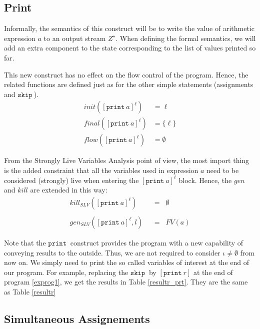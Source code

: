 \documentclass[a4wide,12pt]{article}
\def\eq{\;\; = \;\;}
\def\skip {\texttt{skip}\ }
\def\print{\texttt{print}\ }
\def\program#1{\fbox{\begin{minipage}{0.5\textwidth}\protect{$\begin{array}{ll} #1 \end{array}$}\end{minipage}}}
\def\restabR#1#2[#3]{\begin{table}\label{#3}\begin{center}\caption{#1}\begin{sideways}\end{sideways}\end{center}\end{table}}
\begin{document}
\subsection{Print}
 
Informally, the semantics of this construct will be to write the value of arithmetic expression $a$ to an output
stream $Z^\star$. When defining the formal semantics, we will add an extra component to the state corresponding to the
list of values printed so far.
 
This new construct has no effect on the flow control of the program. Hence, the related functions are
defined just as for the other simple statements (assignments and $\skip$).
\begin{align*}
init([\print a]^\ell) & = \ell \\
final([\print a]^\ell) & = \{\ell\} \\
flow([\print a]^\ell) & = \emptyset
\end{align*}
 
From the Strongly Live Variables Analysis point of view, the most import thing is
the added constraint that all the variables used in expression $a$ need to be
considered (strongly) live when entering the $[\print a]^\ell$ block. Hence, the $gen$ and $kill$ are extended in this way:
\begin{align*}
kill_{SLV}([\print a]^\ell) & \eq \emptyset \\
\\
gen_{SLV}([\print a]^\ell,l) & \eq FV(a)
\end{align*}
 
Note that the $\print$ construct provides the program with a new capability of conveying
results to the outside. Thus, we are not required to consider $\iota \neq \emptyset$ from now on.
We simply need to print the so called variables of interest at the end of our program.
For example, replacing the $\skip$ by  $[\print r]$ at the end of program \ref{exprog1},
we get the results in Table \ref{resultr_prt}. They are the same as Table \ref{resultr}
 
\program{}

\restabR{Strongly Live Variable Analysis with $\iota = \{\}$ and $\print$}{resultr_prt.tex}[resultr_prt]
 
\subsection{Simultaneous Assignements}
 
\end{document}

